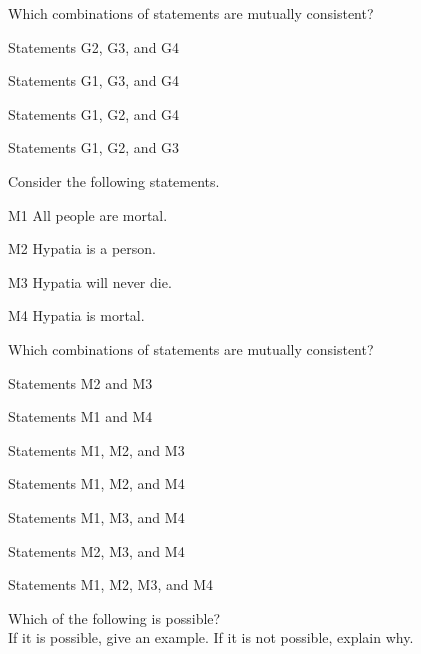 \documentclass[PHIL101-Textbook.tex]{subfiles}
\begin{document}
Which combinations of statements are mutually consistent?
\begin{earg}
\item Statements G2, G3, and G4
\item Statements G1, G3, and G4
\item Statements G1, G2, and G4
\item Statements G1, G2, and G3
\end{earg}
\noindent\solutions\problempart  \label{pr.EnglishConsistent}
Consider the following statements.
\begin{ebullet}%
\item[M1] \label{itm:allmortal} All people are mortal.
\item[M2] \label{itm:socperson} Hypatia is a person.
\item[M3] \label{itm:socnotdie} Hypatia will never die.
\item[M4] \label{itm:socmortal} Hypatia is mortal.
\end{ebullet}
Which combinations of statements are mutually consistent?\begin{earg}
\item Statements M2 and M3
\item Statements M1 and M4
\item Statements M1, M2, and M3
\item Statements M1, M2, and M4
\item Statements M1, M3, and M4
\item Statements M2, M3, and M4
\item Statements M1, M2, M3, and M4
\end{earg}
\noindent\solutions\problempart \label{pr.EnglishCombinations2}
Which of the following is possible? \\
\indent If it is possible, give an example. If it is not possible, explain why.
\end{document}
